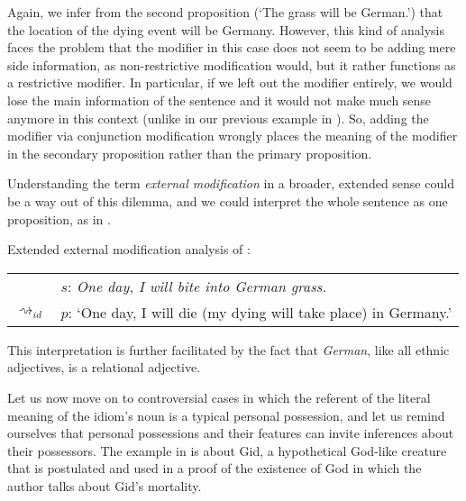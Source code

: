 \documentclass[output=paper]{langsci/langscibook}
\begin{document}
\noindent Again, we infer from the second proposition (`The grass will be German.') that the location of the dying event will be Germany. However, this kind of analysis faces the problem that the modifier in this case does not seem to be adding mere side information, as non-restrictive modification would, but it rather functions as a restrictive modifier. In particular, if we left out the modifier entirely, we would lose the main information of the sentence and it would not make much sense anymore in this context (unlike in our previous example in ). So, adding the modifier via conjunction modification wrongly places the meaning of the modifier in the secondary proposition rather than the primary proposition. 

Understanding the term \textit{external modification} in a broader, extended sense could be a way out of this dilemma, and we could interpret the whole sentence as one proposition, as in .

\ea \label{analysis2 German grass} 
Extended external modification analysis of : \\
\vspace{5pt}
\begin{tabular}{ll}
& 	$s$: \hspace{5pt} \textit{One day, I will bite into German grass.} \\
$\rightsquigarrow_{id%
}$ &	$p$: \hspace{2pt} `One day, I will die (my dying will take place) in Germany.' \\
\end{tabular}
\z

\noindent This interpretation is further facilitated by the fact that \textit{German}, like all ethnic adjectives, is a relational adjective. 

Let us now move on to controversial cases in which the referent of the literal meaning of the idiom's noun is a typical personal possession, and let us remind ourselves that personal possessions and their features can invite inferences about their possessors. The example in  is about Gid, a hypothetical God-like creature that is postulated and used in a proof of the existence of God in which the author talks about Gid's mortality.
\end{document}
